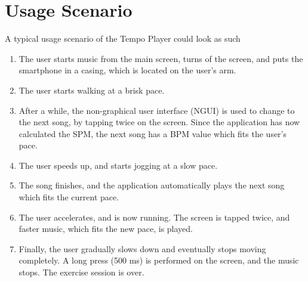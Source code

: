 \section{Usage Scenario}
A typical usage scenario of the Tempo Player could look as such

\begin{enumerate}
\item The user starts music from the main screen, turns of the screen, and puts the smartphone in a casing, which is located on the user's arm. 
\item The user starts walking at a brisk pace.
\item After a while, the non-graphical user interface (NGUI) is used to change to the next song, by tapping twice on the screen.
\subitem Since the application has now calculated the SPM, the next song has a BPM value which fits the user's pace.
\item The user speeds up, and starts jogging at a slow pace. 
\item The song finishes, and the application automatically plays the next song which fits the current pace.
\item The user accelerates, and is now running. The screen is tapped twice, and faster music, which fits the new pace, is played.
\item Finally, the user gradually slows down and eventually stops moving completely. A long press (500 ms) is performed on the screen, and the music stops. The exercise session is over. 
\end{enumerate}